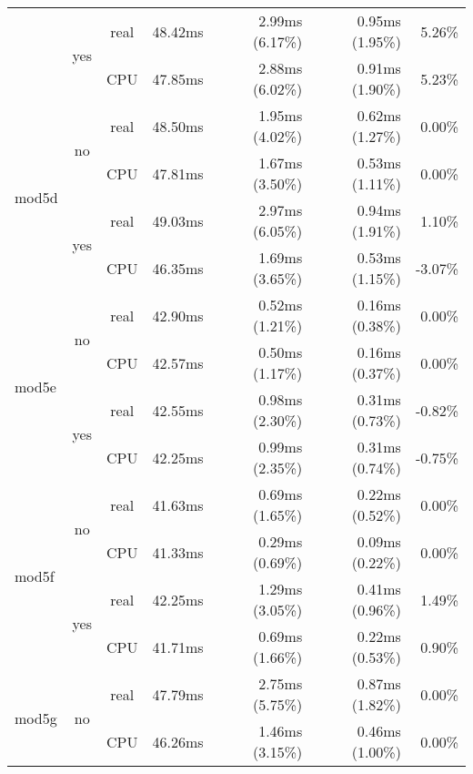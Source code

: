 \documentclass[en]{pracamgr}
\begin{document}
\begin{appendices}
\begin{small}
\begin{longtable}{|l|c|c|r|r|r|r|}
                          \cline{2-7}
                          & \multirow{2}{*}{yes} & real & 48.42ms & 2.99ms (6.17\%) & 0.95ms (1.95\%) & 5.26\% \\*
                          &                      & CPU  & 47.85ms & 2.88ms (6.02\%) & 0.91ms (1.90\%) & 5.23\% \\
\hline
\multirow{4}{*}{mod5d}    & \multirow{2}{*}{no}  & real & 48.50ms & 1.95ms (4.02\%) & 0.62ms (1.27\%) & 0.00\% \\*
                          &                      & CPU  & 47.81ms & 1.67ms (3.50\%) & 0.53ms (1.11\%) & 0.00\% \\*
                          \cline{2-7}
                          & \multirow{2}{*}{yes} & real & 49.03ms & 2.97ms (6.05\%) & 0.94ms (1.91\%) & 1.10\% \\*
                          &                      & CPU  & 46.35ms & 1.69ms (3.65\%) & 0.53ms (1.15\%) & -3.07\% \\
\hline
\multirow{4}{*}{mod5e}    & \multirow{2}{*}{no}  & real & 42.90ms & 0.52ms (1.21\%) & 0.16ms (0.38\%) & 0.00\% \\*
                          &                      & CPU  & 42.57ms & 0.50ms (1.17\%) & 0.16ms (0.37\%) & 0.00\% \\*
                          \cline{2-7}
                          & \multirow{2}{*}{yes} & real & 42.55ms & 0.98ms (2.30\%) & 0.31ms (0.73\%) & -0.82\% \\*
                          &                      & CPU  & 42.25ms & 0.99ms (2.35\%) & 0.31ms (0.74\%) & -0.75\% \\
\hline
\multirow{4}{*}{mod5f}    & \multirow{2}{*}{no}  & real & 41.63ms & 0.69ms (1.65\%) & 0.22ms (0.52\%) & 0.00\% \\*
                          &                      & CPU  & 41.33ms & 0.29ms (0.69\%) & 0.09ms (0.22\%) & 0.00\% \\*
                          \cline{2-7}
                          & \multirow{2}{*}{yes} & real & 42.25ms & 1.29ms (3.05\%) & 0.41ms (0.96\%) & 1.49\% \\*
                          &                      & CPU  & 41.71ms & 0.69ms (1.66\%) & 0.22ms (0.53\%) & 0.90\% \\
\hline
\multirow{4}{*}{mod5g}    & \multirow{2}{*}{no}  & real & 47.79ms & 2.75ms (5.75\%) & 0.87ms (1.82\%) & 0.00\% \\*
                          &                      & CPU  & 46.26ms & 1.46ms (3.15\%) & 0.46ms (1.00\%) & 0.00\% \\*

\end{longtable}
\end{small}
\end{appendices}
\end{document}
